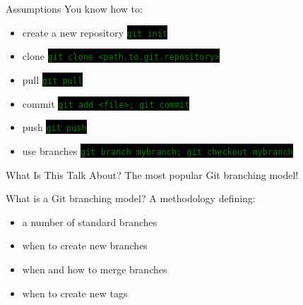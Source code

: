 \documentclass[
14pt,
aspectratio=169,
usenames,
dvipsnames,
x11names]{beamer}
\newcommand{\code}[1]{{\small\colorbox{black}{\textcolor{green}{\texttt{#1}}}}}
\begin{document}
\begin{frame}{Assumptions}
  \alert{You} know how to:
  \begin{itemize}
  \item create a new repository \hfill \code{git init}
  \item clone \hfill \code{git clone <path.to.git.repository>}
  \item pull \hfill \code{git pull}
  \item commit \hfill \code{git add <file>; git commit}
  \item push \hfill \code{git push}
  \item use branches \hfill \code{git branch mybranch; git checkout mybranch}
  \end{itemize}
\end{frame}

\begin{frame}{What Is This Talk About?}
  \centering
  The \alert{most popular} Git branching model!
\end{frame}

\begin{frame}{What is a Git branching model?}
  A \alert{methodology} defining:\\[1ex]
  \begin{itemize} \setlength{\itemsep}{\fill}
  \item a number of standard branches
  \item when to create new branches
  \item when and how to merge branches
  \item when to create new tags
  \end{itemize}
\end{frame}
\end{document}
